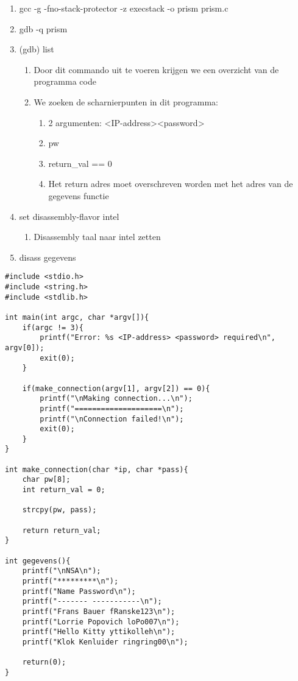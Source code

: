 \begin{enumerate}
  \item gcc -g -fno-stack-protector -z execstack -o prism prism.c
  \item gdb -q prism 
  \item (gdb) list
  	\begin{enumerate}
  	\item Door dit commando uit te voeren krijgen we een overzicht van de programma code
  	\item We zoeken de scharnierpunten in dit programma:
  		\begin{enumerate}
  		\item 2 argumenten: \textless IP-address\textgreater \textless password\textgreater
  		\item pw
  		\item return\_val == 0
 		\item Het return adres moet overschreven worden met het adres van de gegevens functie
  		\end{enumerate}
  	\end{enumerate}
  \item set disassembly-flavor intel
  	\begin{enumerate}
  	\item Disassembly taal naar intel zetten
  	\end{enumerate}
  \item disass gegevens
  
  
\end{enumerate}

\begin{lstlisting}
#include <stdio.h>
#include <string.h>
#include <stdlib.h>

int main(int argc, char *argv[]){
	if(argc != 3){
		printf("Error: %s <IP-address> <password> required\n", argv[0]);
		exit(0);
	}

	if(make_connection(argv[1], argv[2]) == 0){
		printf("\nMaking connection...\n");
		printf("====================\n");
		printf("\nConnection failed!\n");
		exit(0);
	}
}

int make_connection(char *ip, char *pass){
	char pw[8];
	int return_val = 0;

	strcpy(pw, pass);

	return return_val;
}

int gegevens(){
	printf("\nNSA\n");
	printf("*********\n");
	printf("Name Password\n");
	printf("------- -----------\n");
	printf("Frans Bauer fRanske123\n");
	printf("Lorrie Popovich loPo007\n");
	printf("Hello Kitty yttikolleh\n");
	printf("Klok Kenluider ringring00\n");

	return(0);
}
\end{lstlisting}